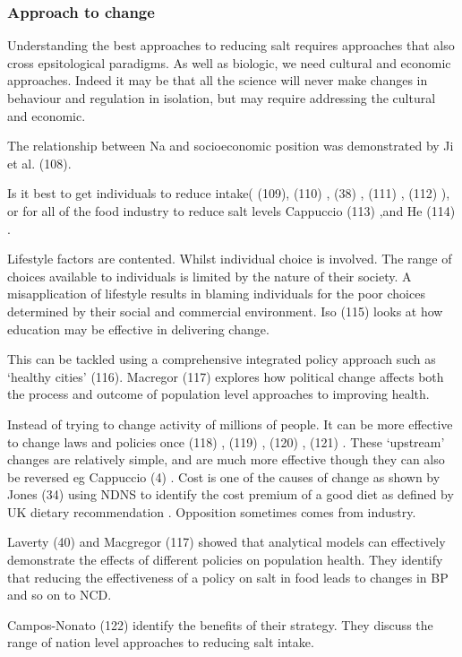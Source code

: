 \documentclass[
]{article}
\begin{document}
\hypertarget{approach-to-change}{%
\subsubsection{Approach to change}\label{approach-to-change}}

Understanding the best approaches to reducing salt requires approaches
that also cross epsitological paradigms. As well as biologic, we need
cultural and economic approaches. Indeed it may be that all the science
will never make changes in behaviour and regulation in isolation, but
may require addressing the cultural and economic.

The relationship between Na and socioeconomic position was demonstrated
by Ji et al. (108).

Is it best to get individuals to reduce intake( (109), (110) , (38) ,
(111) , (112) ), or for all of the food industry to reduce salt levels
Cappuccio (113) ,and He (114) .

Lifestyle factors are contented. Whilst individual choice is involved.
The range of choices available to individuals is limited by the nature
of their society. A misapplication of lifestyle results in blaming
individuals for the poor choices determined by their social and
commercial environment. Iso (115) looks at how education may be
effective in delivering change.

This can be tackled using a comprehensive integrated policy approach
such as `healthy cities' (116). Macregor (117) explores how political
change affects both the process and outcome of population level
approaches to improving health.

Instead of trying to change activity of millions of people. It can be
more effective to change laws and policies once (118) , (119) , (120) ,
(121) . These `upstream' changes are relatively simple, and are much
more effective though they can also be reversed eg Cappuccio (4) . Cost
is one of the causes of change as shown by Jones (34) using NDNS to
identify the cost premium of a good diet as defined by UK dietary
recommendation . Opposition sometimes comes from industry.

Laverty (40) and Macgregor (117) showed that analytical models can
effectively demonstrate the effects of different policies on population
health. They identify that reducing the effectiveness of a policy on
salt in food leads to changes in BP and so on to NCD.

Campos-Nonato (122) identify the benefits of their strategy. They
discuss the range of nation level approaches to reducing salt intake.
\end{document}
